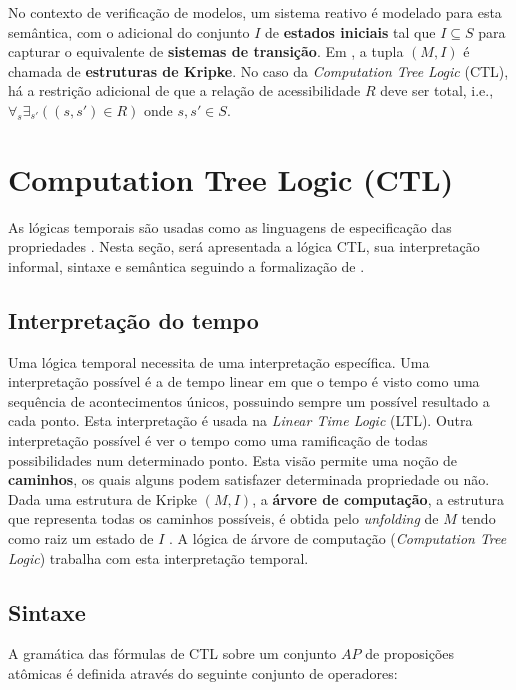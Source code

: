 \documentclass[cic,tc]{infufrgs}
\begin{document}
	No contexto de verificação de modelos, um sistema reativo é modelado para esta semântica, com o adicional do conjunto $I$ de \textbf{estados iniciais} tal que $I \subseteq S$ para capturar o equivalente de \textbf{sistemas de transição}. Em , a tupla $(M,I)$ é chamada de \textbf{estruturas de Kripke}. No caso da \textit{Computation Tree Logic} (CTL), há a restrição adicional de que a relação de acessibilidade $R$ deve ser total, i.e., $\forall_s\exists_{s'}((s,s')\in R)$ onde $s,s'\in S$. 
	
	\section{Computation Tree Logic (CTL)}
	\label{sec:ctl}
	As lógicas temporais são usadas como as linguagens de especificação das propriedades \cite{clarkeIntroductionModelChecking2018}.
	Nesta seção, será apresentada a lógica CTL, sua interpretação informal, sintaxe e semântica seguindo a formalização de .
	
	\subsection{Interpretação do tempo}
	\label{sec:ctl_interpretacao}
	Uma lógica temporal necessita de uma interpretação específica. 
	Uma interpretação possível é a de tempo linear em que o tempo é visto como uma sequência de acontecimentos únicos, possuindo sempre um possível resultado a cada ponto. 
	Esta interpretação é usada na \textit{Linear Time Logic} (LTL).
	Outra interpretação possível é ver o tempo como uma ramificação de todas possibilidades num determinado ponto. 
	Esta visão permite uma noção de \textbf{caminhos}, os quais alguns podem satisfazer determinada propriedade ou não.
	Dada uma estrutura de Kripke $(M,I)$, a \textbf{árvore de computação}, a estrutura que representa todas os caminhos possíveis, é obtida pelo \textit{unfolding} de $M$ tendo como raiz um estado de $I$ \cite{baierPrinciplesModelChecking2008a}. 
	A lógica de árvore de computação (\textit{Computation Tree Logic}) trabalha com esta interpretação temporal.
	
	\subsection{Sintaxe}
	\label{sec:ctl_sintaxe}
	
	A gramática das fórmulas de CTL sobre um conjunto $AP$ de proposições atômicas é definida através do seguinte conjunto de operadores:
	
\end{document}

